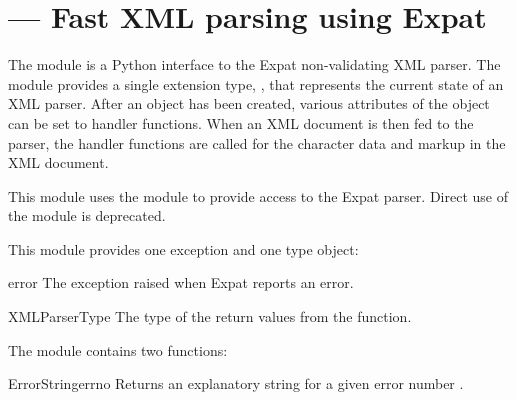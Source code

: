 \section{ ---
         Fast XML parsing using Expat}



The  module is a Python interface to the
Expat non-validating XML parser.
The module provides a single extension type, , that
represents the current state of an XML parser.  After an
 object has been created, various attributes of the object 
can be set to handler functions.  When an XML document is then fed to
the parser, the handler functions are called for the character data
and markup in the XML document.

This module uses the  module to
provide access to the Expat parser.  Direct use of the
 module is deprecated.

This module provides one exception and one type object:

\begin{excdesc}{error}
  The exception raised when Expat reports an error.
\end{excdesc}

\begin{datadesc}{XMLParserType}
  The type of the return values from the 
  function.
\end{datadesc}


The  module contains two functions:

\begin{funcdesc}{ErrorString}{errno}
Returns an explanatory string for a given error number .
\end{funcdesc}

